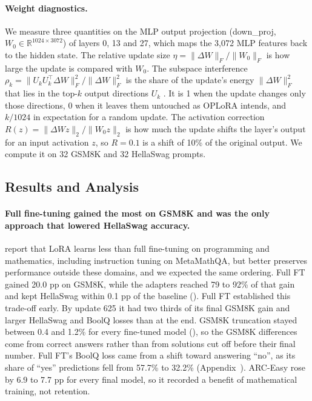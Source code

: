 \documentclass{article}
\begin{document}
\paragraph{Weight diagnostics.} We measure three quantities on the MLP output projection (down\_proj, $W_0\in\mathbb R^{1024\times3072}$) of layers 0, 13 and 27, which maps the 3,072 MLP features back to the hidden state. The relative update size $\eta=\lVert\Delta W\rVert_F/\lVert W_0\rVert_F$ is how large the update is compared with $W_0$. The subspace interference $\rho_k=\lVert U_kU_k^\top\Delta W\rVert_F^2/\lVert\Delta W\rVert_F^2$ is the share of the update's energy $\lVert\Delta W\rVert_F^2$ that lies in the top-$k$ output directions $U_k$ \citep{oplora}. It is 1 when the update changes only those directions, 0 when it leaves them untouched as OPLoRA intends, and $k/1024$ in expectation for a random update. The activation correction $R(z)=\lVert\Delta Wz\rVert_2/\lVert W_0z\rVert_2$ is how much the update shifts the layer's output for an input activation $z$, so $R=0.1$ is a shift of 10\% of the original output. We compute it on 32 GSM8K and 32 HellaSwag prompts.

\subsection{Results and Analysis}
\paragraph{Full fine-tuning gained the most on GSM8K and was the only approach that lowered HellaSwag accuracy.}
\citet{loralearnsless} report that LoRA learns less than full fine-tuning on programming and mathematics, including instruction tuning on MetaMathQA, but better preserves performance outside these domains, and we expected the same ordering. Full FT gained 20.0 pp on GSM8K, while the adapters reached 79 to 92\% of that gain and kept HellaSwag within 0.1 pp of the baseline (). Full FT established this trade-off early. By update 625 it had two thirds of its final GSM8K gain and larger HellaSwag and BoolQ losses than at the end. GSM8K truncation stayed between 0.4 and 1.2\% for every fine-tuned model (), so the GSM8K differences come from correct answers rather than from solutions cut off before their final number. Full FT's BoolQ loss came from a shift toward answering ``no'', as its share of ``yes'' predictions fell from 57.7\% to 32.2\% (Appendix~). ARC-Easy rose by 6.9 to 7.7 pp for every final model, so it recorded a benefit of mathematical training, not retention.
\end{document}
